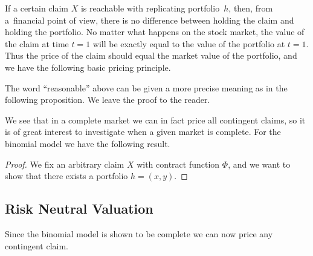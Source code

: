 \documentclass{Base}
\begin{document}
If a certain claim $X$ is reachable with replicating portfolio~$h$, then,
from a~financial point of view, there is no difference between holding the
claim and holding the portfolio. No matter what happens on the stock market,
the value of the claim at time $t=1$ will be exactly equal to the value of
the portfolio at $t=1$. Thus the price of the claim should equal the market
value of the portfolio, and we have the following basic pricing principle.

The word ``reasonable'' above can be given a more precise meaning as in the
following proposition. We leave the proof to the reader.

We see that in a complete market we can in fact price all contingent claims,
so it is of great interest to investigate when a given market is complete.
For the binomial model we have the following result.

\begin{table}[b]
\end{table}

\begin{proof}
We fix an arbitrary claim $X$ with contract function $\Phi$, and we want to
show that there exists a portfolio $h=(x,y)$.
\end{proof}

\subsection{Risk Neutral Valuation}
\label{brnv}

Since the binomial model is shown to be complete we can now price any
contingent claim.
\end{document}
